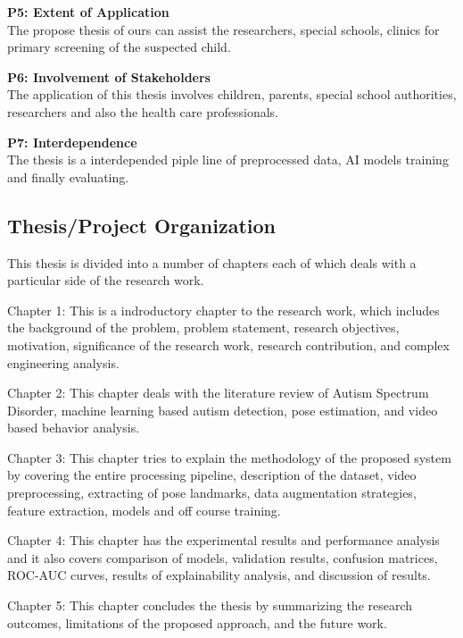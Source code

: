 \textbf{P5: Extent of Application} \\
The propose thesis of ours can assist the researchers, special schools, clinics for primary screening of the suspected child.

\textbf{P6: Involvement of Stakeholders} \\
The application of this thesis involves children, parents, special school authorities, researchers and also the health care professionals.

\textbf{P7: Interdependence} \\
The thesis is a interdepended piple line of preprocessed data, AI models training and finally evaluating.

 
\subsection{Thesis/Project Organization}

This thesis is divided into a number of chapters each of which deals with a particular side of the research work.

Chapter 1: This is a indroductory chapter to the research work, which includes the background of the problem, problem statement, research objectives, motivation, significance of the research work, research contribution, and complex engineering analysis.

Chapter 2: This chapter deals with the literature review of Autism Spectrum Disorder, machine learning based autism detection, pose estimation, and video based behavior analysis.

Chapter 3: This chapter tries to explain the methodology of the proposed system by covering the entire processing pipeline, description of the dataset, video preprocessing, extracting of pose landmarks, data augmentation strategies, feature extraction, models and off course training.

Chapter 4: This chapter has the experimental results and performance analysis and it also covers comparison of models, validation results, confusion matrices, ROC-AUC curves, results of explainability analysis, and discussion of results.

Chapter 5: This chapter concludes the thesis by summarizing the research outcomes, limitations of the proposed approach, and the future work.


